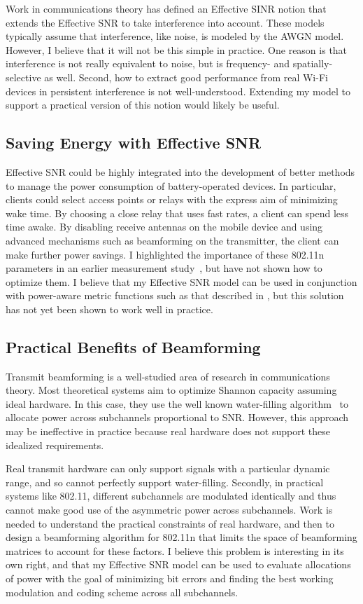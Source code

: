 Work in communications theory has defined an Effective SINR notion that extends the Effective SNR to take interference into account. These models typically assume that interference, like noise, is modeled by the AWGN model. However, I believe that it will not be this simple in practice. One reason is that interference is not really equivalent to noise, but is frequency- and spatially-selective as well. Second, how to extract good performance from real Wi-Fi devices in persistent interference is not well-understood. Extending my model to support a practical version of this notion would likely be useful.

\subsection{Saving Energy with Effective SNR}
Effective SNR could be highly integrated into the development of better methods to manage the power consumption of battery-operated devices. In particular, clients could select access points or relays with the express aim of minimizing wake time. By choosing a close relay that uses fast rates, a client can spend less time awake. By disabling receive antennas on the mobile device and using advanced mechanisms such as beamforming on the transmitter, the client can make further power savings. I highlighted the importance of these 802.11n parameters in an earlier measurement study~\cite{Halperin_Power}, but have not shown how to optimize them. I believe that my Effective SNR model can be used in conjunction with power-aware metric functions such as that described in , but this solution has not yet been shown to work well in practice.

\subsection{Practical Benefits of Beamforming}
Transmit beamforming is a well-studied area of research in communications theory. Most theoretical systems aim to optimize Shannon capacity assuming ideal hardware. In this case, they use the well known water-filling algorithm~\cite[p. 183]{Tse} to allocate power across subchannels proportional to SNR. However, this approach may be ineffective in practice because real hardware does not support these idealized requirements.

Real transmit hardware can only support signals with a particular dynamic range, and so cannot perfectly support water-filling. Secondly, in practical systems like 802.11, different subchannels are modulated identically and thus cannot make good use of the asymmetric power across subchannels. Work is needed to understand the practical constraints of real hardware, and then to design a beamforming algorithm for 802.11n that limits the space of beamforming matrices to account for these factors. I believe this problem is interesting in its own right, and that my Effective SNR model can be used to evaluate allocations of power with the goal of minimizing bit errors and finding the best working modulation and coding scheme across all subchannels.


